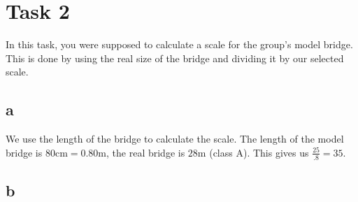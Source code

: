 \documentclass{report}
\begin{document}
\section{Task 2}









In this task, you were supposed to calculate a scale for the group's model bridge. This is done by using the real size of the bridge and dividing it by our selected scale.

\subsection{a}

We use the length of the bridge to calculate the scale. The length of the model bridge is $80\mathrm {cm} = 0.80\mathrm m$, the real bridge is $28\mathrm m$ (class A). This gives us $\frac {25} {.8} = 35$.

\subsection{b}
\end{document}
